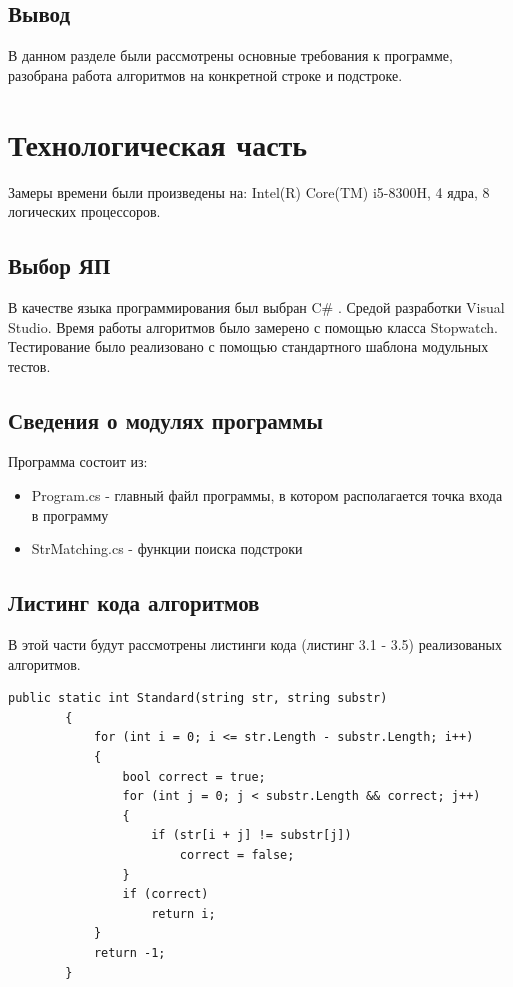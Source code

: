 \documentclass[12pt]{report}
\begin{document}
\section*{Вывод}
В данном разделе были рассмотрены основные требования к программе, разобрана работа алгоритмов на конкретной строке и подстроке.

 

\chapter{Технологическая часть}
Замеры времени были произведены на: Intel(R) Core(TM) i5-8300H, 4 ядра, 8 логических процессоров.

\section{Выбор ЯП}
В качестве языка программирования был выбран C\# \cite{Microsoft}. Средой разработки Visual Studio. 
Время работы алгоритмов было замерено с помощью класса Stopwatch. Тестирование было реализовано
с помощью стандартного шаблона модульных тестов\cite{UnitTests}.

\section{Сведения о модулях программы}
Программа состоит из:
\begin{itemize}
	\item Program.cs - главный файл программы, в котором располагается точка входа в программу
	\item StrMatching.cs - функции поиска подстроки
\end{itemize}


\section{Листинг кода алгоритмов}
В этой части будут рассмотрены листинги кода (листинг 3.1 - 3.5) реализованых алгоритмов.
\begin{lstlisting}[label=some-code,caption=Стандартная функция]
public static int Standard(string str, string substr)
        {
            for (int i = 0; i <= str.Length - substr.Length; i++)
            {
                bool correct = true; 
                for (int j = 0; j < substr.Length && correct; j++)
                {
                    if (str[i + j] != substr[j])
                        correct = false;
                }
                if (correct)
                    return i;
            }
            return -1;
        }
\end{lstlisting}
\end{document}
